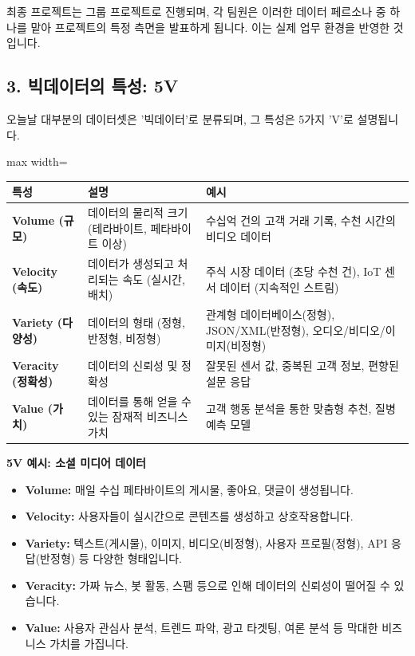 \documentclass[11pt,a4paper]{article}
\begin{document}
\begin{notebox}
최종 프로젝트는 그룹 프로젝트로 진행되며, 각 팀원은 이러한 데이터 페르소나 중 하나를 맡아 프로젝트의 특정 측면을 발표하게 됩니다. 이는 실제 업무 환경을 반영한 것입니다.
\end{notebox}

\subsection*{3. 빅데이터의 특성: 5V}

오늘날 대부분의 데이터셋은 '빅데이터'로 분류되며, 그 특성은 5가지 'V'로 설명됩니다.

\begin{adjustbox}{max width=\textwidth}
\begin{tabular}{lll}
\toprule
\textbf{특성} & \textbf{설명} & \textbf{예시} \\
\midrule
\textbf{Volume (규모)} & 데이터의 물리적 크기 (테라바이트, 페타바이트 이상) & 수십억 건의 고객 거래 기록, 수천 시간의 비디오 데이터 \\
\textbf{Velocity (속도)} & 데이터가 생성되고 처리되는 속도 (실시간, 배치) & 주식 시장 데이터 (초당 수천 건), IoT 센서 데이터 (지속적인 스트림) \\
\textbf{Variety (다양성)} & 데이터의 형태 (정형, 반정형, 비정형) & 관계형 데이터베이스(정형), JSON/XML(반정형), 오디오/비디오/이미지(비정형) \\
\textbf{Veracity (정확성)} & 데이터의 신뢰성 및 정확성 & 잘못된 센서 값, 중복된 고객 정보, 편향된 설문 응답 \\
\textbf{Value (가치)} & 데이터를 통해 얻을 수 있는 잠재적 비즈니스 가치 & 고객 행동 분석을 통한 맞춤형 추천, 질병 예측 모델 \\
\bottomrule
\end{tabular}
\end{adjustbox}

\begin{examplebox}
\textbf{5V 예시: 소셜 미디어 데이터}
\begin{itemize}
    \item \textbf{Volume:} 매일 수십 페타바이트의 게시물, 좋아요, 댓글이 생성됩니다.
    \item \textbf{Velocity:} 사용자들이 실시간으로 콘텐츠를 생성하고 상호작용합니다.
    \item \textbf{Variety:} 텍스트(게시물), 이미지, 비디오(비정형), 사용자 프로필(정형), API 응답(반정형) 등 다양한 형태입니다.
    \item \textbf{Veracity:} 가짜 뉴스, 봇 활동, 스팸 등으로 인해 데이터의 신뢰성이 떨어질 수 있습니다.
    \item \textbf{Value:} 사용자 관심사 분석, 트렌드 파악, 광고 타겟팅, 여론 분석 등 막대한 비즈니스 가치를 가집니다.
\end{itemize}
\end{examplebox}
\end{document}
